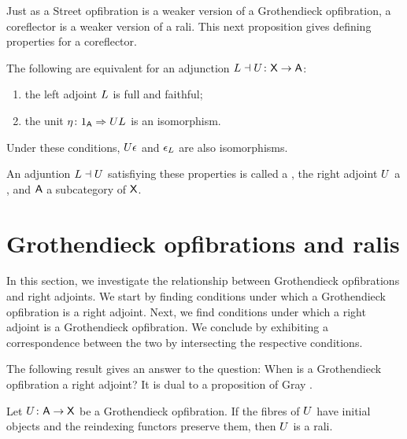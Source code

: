 \documentclass{amsart}
\begin{document}
Just as a Street opfibration is a weaker version of a Grothendieck
opfibration, a coreflector is a weaker version of a rali.  This next
proposition gives defining properties for a coreflector.

\begin{prop}\label{prop:coreflection}
  The following are equivalent for an adjunction
  $L\dashv U\colon\mathsf{X}\to\mathsf{A}$:
  \begin{enumerate}
  \item the left adjoint $L$ is full and faithful;
  \item the unit $\eta\colon1_{\mathsf{A}}\Rightarrow UL$ is an isomorphism.
 \end{enumerate}
 Under these conditions, $U\epsilon$ and $\epsilon_L$ are also
 isomorphisms.
\end{prop}

An adjuntion $L\dashv U$ satisfiying these properties is called a
, the right adjoint $U$ a , and
$\mathsf{A}$ a  subcategory of $\mathsf{X}$.



\section{Grothendieck opfibrations and ralis}
\label{sec:groth-fibs-ralis}

In this section, we investigate the relationship between Grothendieck opfibrations and right adjoints. We start by finding conditions under which a Grothendieck opfibration is a right adjoint.  Next, we find conditions under which a right adjoint is a Grothendieck opfibration. We conclude by exhibiting a correspondence between the two by intersecting the respective conditions.

The following result gives an answer to the question: When is a Grothendieck opfibration a right adjoint? It is dual to a proposition of Gray \cite[Prop. 4.4]{Grayfibredandcofibred}.

\begin{prop} \label{prop:opfibtolari} Let $U \colon \mathsf{A} \to \mathsf{X}$ be a Grothendieck  opfibration. If the fibres of $U$ have initial objects and the reindexing functors preserve them, then $U$ is a rali.
\end{prop}
\end{document}
